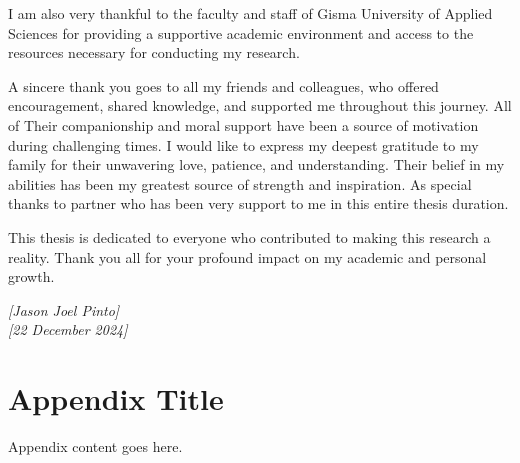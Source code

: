 \documentclass[12pt,twocolumn]{report}
\begin{document}
I am also very thankful to the faculty and staff of Gisma University of Applied Sciences for providing a supportive academic environment and access to the resources necessary for conducting my research. 

A sincere thank you goes to all my friends and colleagues, who offered encouragement, shared knowledge, and supported me throughout this journey. All of Their companionship and moral support have been a source of motivation during challenging times. I would like to express my deepest gratitude to my family for their unwavering love, patience, and understanding. Their belief in my abilities has been my greatest source of strength and inspiration. As special thanks to partner who has been very support to me in this entire thesis duration.

This thesis is dedicated to everyone who contributed to making this research a reality. Thank you all for your profound impact on my academic and personal growth.

\begin{flushright}
\textit{[Jason Joel Pinto]} \\
\textit{[22 December 2024]}
\end{flushright}

\appendix
\chapter{Appendix Title}
Appendix content goes here.

\cleardoublepage
\printbibliography
\end{document}
